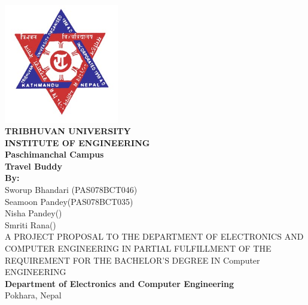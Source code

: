 \newenvironment{coverpage}
\thispagestyle{empty}
\begin{titlepage}
 
  \noindent%
  
  \begin{center}
  	\includegraphics[width=50mm]{figures/tu.jpg}\\
  
\textsc{\LARGE \bfseries TRIBHUVAN UNIVERSITY}\\[0.5cm] %
\textsc{\large \bfseries INSTITUTE OF ENGINEERING}\\
\large \textbf{ Paschimanchal Campus } \\[0.5cm]
\vspace{0.5cm}
\Large \textbf{Travel Buddy}\\[0.5cm]
\vspace{0.5cm}
\textbf{By:}\\
\large{ Sworup Bhandari   (PAS078BCT046) \\
Seamoon Pandey(PAS078BCT035)\\
Nisha Pandey()\\
Smriti Rana()}\\
\vspace{1.2cm}
A PROJECT PROPOSAL TO THE DEPARTMENT OF ELECTRONICS AND COMPUTER
	ENGINEERING IN PARTIAL FULFILLMENT OF THE REQUIREMENT FOR THE BACHELOR'S
	DEGREE IN Computer ENGINEERING \\[1.2cm]


\textbf{Department of Electronics and Computer Engineering}\\
Pokhara, Nepal
\\[0.4cm]
\vspace{0.5cm}

\end{center}
\end{titlepage}
